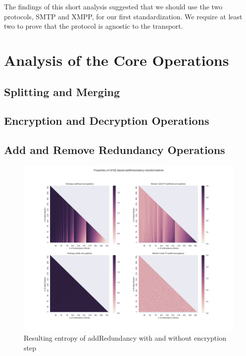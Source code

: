 The findings of this short analysis suggested that we should use the two protocols, SMTP and XMPP, for our first standardization. We require at least two to prove that the protocol is agnostic to the transport.

\chapter{Analysis of the Core Operations}
\section{Splitting and Merging}
\section{Encryption and Decryption Operations}
\section{Add and Remove Redundancy Operations}\label{sec:analysisReedSolomon}
\begin{figure}[!t]\centering
	\includegraphics[width=1\textwidth]{inc/randomblock_10kb}
	\caption{Resulting entropy of addRedundancy with and without encryption step}
	\label{fig:entropy}
\end{figure}




